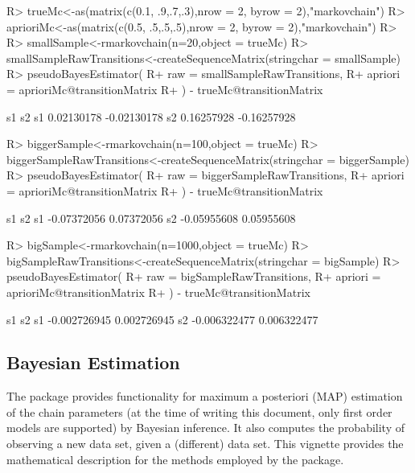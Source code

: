\documentclass[
  nojss]{jss}
\begin{document}
\begin{CodeChunk}

\begin{CodeInput}
R> trueMc<-as(matrix(c(0.1, .9,.7,.3),nrow = 2, byrow = 2),"markovchain")
R> aprioriMc<-as(matrix(c(0.5, .5,.5,.5),nrow = 2, byrow = 2),"markovchain")
R> 
R> smallSample<-rmarkovchain(n=20,object = trueMc)
R> smallSampleRawTransitions<-createSequenceMatrix(stringchar = smallSample)
R> pseudoBayesEstimator(
R+   raw = smallSampleRawTransitions, 
R+   apriori = aprioriMc@transitionMatrix
R+ ) - trueMc@transitionMatrix
\end{CodeInput}

\begin{CodeOutput}
           s1          s2
s1 0.02130178 -0.02130178
s2 0.16257928 -0.16257928
\end{CodeOutput}

\begin{CodeInput}
R> biggerSample<-rmarkovchain(n=100,object = trueMc)
R> biggerSampleRawTransitions<-createSequenceMatrix(stringchar = biggerSample)
R> pseudoBayesEstimator(
R+   raw = biggerSampleRawTransitions,
R+   apriori = aprioriMc@transitionMatrix
R+ ) - trueMc@transitionMatrix
\end{CodeInput}

\begin{CodeOutput}
            s1         s2
s1 -0.07372056 0.07372056
s2 -0.05955608 0.05955608
\end{CodeOutput}

\begin{CodeInput}
R> bigSample<-rmarkovchain(n=1000,object = trueMc)
R> bigSampleRawTransitions<-createSequenceMatrix(stringchar = bigSample)
R> pseudoBayesEstimator(
R+   raw = bigSampleRawTransitions,
R+   apriori = aprioriMc@transitionMatrix
R+ ) - trueMc@transitionMatrix
\end{CodeInput}

\begin{CodeOutput}
             s1          s2
s1 -0.002726945 0.002726945
s2 -0.006322477 0.006322477
\end{CodeOutput}
\end{CodeChunk}

\hypertarget{bayesian-estimation}{%
\subsection{Bayesian Estimation}\label{bayesian-estimation}}

The  package provides functionality for maximum a posteriori (MAP) estimation of the chain parameters (at the time of writing this document, only first order models are supported) by Bayesian inference. It also computes the probability of observing a new data set, given a (different) data set. This vignette provides the mathematical description for the methods employed by the package.
\end{document}
